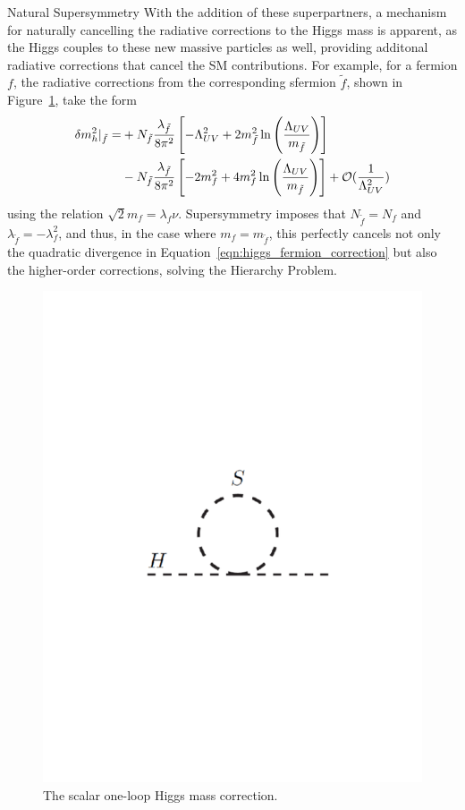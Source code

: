 \begin{section}{Natural Supersymmetry}
With the addition of these superpartners, a mechanism for naturally cancelling the radiative corrections to the Higgs mass is apparent, as the Higgs couples to these new massive particles as well, providing additonal radiative corrections that cancel the SM contributions.
For example, for a fermion $f$, the radiative corrections from the corresponding sfermion $\tilde{f}$, shown in Figure~\ref{fig:higgs_scalar_loop}, take the form
\begin{align}
\delta m_{h}^2|_{\tilde{f}} = &+N_{\tilde{f}}\frac{\lambda_{\tilde{f}}}{8\pi^2} \left[-\Lambda^2_{UV} + 2m_{\tilde{f}}^2\ln\left(\frac{\Lambda_{UV}}{m_{\tilde{f}}}\right)\right] \nonumber \\
                            &-N_{\tilde{f}}\frac{\lambda_{\tilde{f}}}{8\pi^2} \left[-2m_f^2 + 4m_f^2\ln\left(\frac{\Lambda_{UV}}{m_{\tilde{f}}}\right)\right] + \mathcal{O}(\frac{1}{\Lambda^2_{UV}})
\end{align}
using the relation $\sqrt{2}m_f = \lambda_f\nu$.
Supersymmetry imposes that $N_{\tilde{f}} = N_f$ and $\lambda_{\tilde{f}} = -\lambda_f^2$, and thus, in the case where $m_f = m_{\tilde{f}}$, this perfectly cancels not only the quadratic divergence in Equation~\ref{eqn:higgs_fermion_correction} but also the higher-order corrections, solving the Hierarchy Problem.

\begin{figure}[tbp!]
\begin{center}
\includegraphics[angle=0,width=0.60\columnwidth]{fig/higgs_scalar_loop.pdf}
\end{center}
\caption{The scalar one-loop Higgs mass correction.}
\label{fig:higgs_scalar_loop}
\end{figure}


\end{section}
